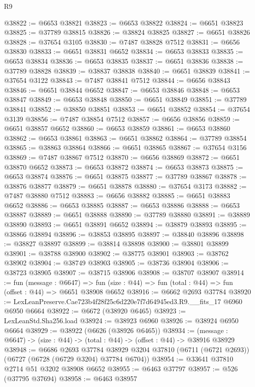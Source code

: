 \begin{lexlean}{R9}
\begin{coremodule}
@38822 := @6653 @38821
@38823 := @6653 @38822
@38824 := @6651 @38823
@38825 := @37789 @38815
@38826 := @38824 @38825
@38827 := @6651 @38826
@38828 := @37654 @3105
@38830 := @7487 @38828 @7512
@38831 := @6656 @38830
@38833 := @6651 @38831 @6652
@38834 := @6653 @38833
@38835 := @6653 @38834
@38836 := @6653 @38835
@38837 := @6651 @38836
@38838 := @37789 @38828
@38839 := @38837 @38838
@38840 := @6651 @38839
@38841 := @37654 @3122
@38843 := @7487 @38841 @7512
@38844 := @6656 @38843
@38846 := @6651 @38844 @6652
@38847 := @6653 @38846
@38848 := @6653 @38847
@38849 := @6653 @38848
@38850 := @6651 @38849
@38851 := @37789 @38841
@38852 := @38850 @38851
@38853 := @6651 @38852
@38854 := @37654 @3139
@38856 := @7487 @38854 @7512
@38857 := @6656 @38856
@38859 := @6651 @38857 @6652
@38860 := @6653 @38859
@38861 := @6653 @38860
@38862 := @6653 @38861
@38863 := @6651 @38862
@38864 := @37789 @38854
@38865 := @38863 @38864
@38866 := @6651 @38865
@38867 := @37654 @3156
@38869 := @7487 @38867 @7512
@38870 := @6656 @38869
@38872 := @6651 @38870 @6652
@38873 := @6653 @38872
@38874 := @6653 @38873
@38875 := @6653 @38874
@38876 := @6651 @38875
@38877 := @37789 @38867
@38878 := @38876 @38877
@38879 := @6651 @38878
@38880 := @37654 @3173
@38882 := @7487 @38880 @7512
@38883 := @6656 @38882
@38885 := @6651 @38883 @6652
@38886 := @6653 @38885
@38887 := @6653 @38886
@38888 := @6653 @38887
@38889 := @6651 @38888
@38890 := @37789 @38880
@38891 := @38889 @38890
@38893 := @6651 @38891 @6652
@38894 := @38879 @38893
@38895 := @38866 @38894
@38896 := @38853 @38895
@38897 := @38840 @38896
@38898 := @38827 @38897
@38899 := @38814 @38898
@38900 := @38801 @38899
@38901 := @38788 @38900
@38902 := @38775 @38901
@38903 := @38762 @38902
@38904 := @38749 @38903
@38905 := @38736 @38904
@38906 := @38723 @38905
@38907 := @38715 @38906
@38908 := @38707 @38907
@38914 := fun (message : @6647) =>
  fun (size : @44) => fun (total : @44) => fun (offset : @44) => @6651 @38908 @6652
@38916 := @6662 @2693 @37784
@38920 := LexLeanPreserve.Cae723b4f28f25c6d220e7f7d64945ed3.R9.__fits_17 @6960 @6950 @6664
@38922 := @6672 (@38920 @6465)
@38923 := LexLeanStd.Sha256.load
@38924 := @38923 @6960
@38926 := @38924 @6950 @6664
@38929 := @38922 (@6626 (@38926 @6465))
@38934 := (message : @6647) -> (size : @44) -> (total : @44) -> (offset : @44) -> @38916 @38929
@38948 := @6686
    @2693
    @37784
    @38929
    @3204
    @37810
    (@6711 (@6721 @2693))
    (@6727 (@6728 (@6729 @3204) @37784 @6704))
@38954 := @33641 @37810 @2714 @51 @3202 @38908 @6652
@38955 := @6463 @37797
@38957 := @526 (@37795 @37694)
@38958 := @6463 @38957

\end{coremodule}
\end{lexlean}
